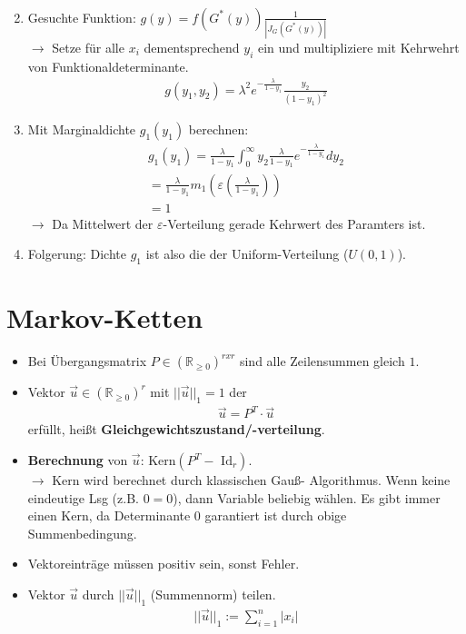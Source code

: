 \documentclass{article}
\begin{document}
\begin{enumerate}
\begin{align}
		\end{align}
	\item Gesuchte Funktion: $g(y) = f(G^*(y))\frac{1}{|J_G(G^*(y))|}$\\
		$\longrightarrow$ Setze für alle $x_i$ dementsprechend $y_i$ ein und multipliziere
		mit Kehrwehrt von Funktionaldeterminante.
		\begin{align}
			g(y_1,y_2) = \lambda^2e^{-\frac{\lambda}{1 - y_1}}\frac{y_2}{(1-y_1)^2}
		\end{align}
	\item Mit Marginaldichte $g_1(y_1)$ berechnen:\\
		\begin{align}
			g_1(y_1) = \frac{\lambda}{1 - y_1} \int^\infty_0 y_2\frac{\lambda}{1 - y_1}
			e^{-\frac{\lambda}{1 - y_1}} dy_2\\
			= \frac{\lambda}{1 - y_1} m_1 (\varepsilon(\frac{\lambda}{1 - y_1}))\\
			= 1
		\end{align}
		$\longrightarrow$ Da Mittelwert der $\varepsilon$-Verteilung gerade Kehrwert des
		Paramters ist.
	\item Folgerung: Dichte $g_1$ ist also die der Uniform-Verteilung ($U(0,1)$).
\end{enumerate}
\section{Markov-Ketten}
\begin{itemize}
	\item Bei Übergangsmatrix $P \in (\mathbb{R}_{\geq 0})^{r x r}$ sind alle Zeilensummen gleich $1$.
	\item Vektor $\vec{u} \in (\mathbb{R}_{\geq 0})^{r}$ mit $||\vec{u}||_1 = 1$
		der
		\begin{align}
			\vec{u} = P^T \cdot \vec{u}
		\end{align}
		erfüllt, heißt \textbf{Gleichgewichtszustand/-verteilung}.
	\item \textbf{Berechnung} von $\vec{u}$: $\text{Kern}(P^T - \text{ Id}_r)$.\\$\rightarrow$
		Kern wird berechnet durch klassischen Gauß- Algorithmus. Wenn keine
		eindeutige Lsg (z.B. $0 = 0$), dann Variable beliebig wählen. Es gibt
			immer einen Kern, da Determinante $0$ garantiert ist durch obige\\
			Summenbedingung.
	\item Vektoreinträge müssen positiv sein, sonst Fehler.
	\item Vektor $\vec{u}$ durch $||\vec{u}||_1$ (Summennorm) teilen.
		\begin{align}
			||\vec{u}||_1 := \sum^n_{i=1}|x_i|
		\end{align}
\end{itemize}
\end{document}
